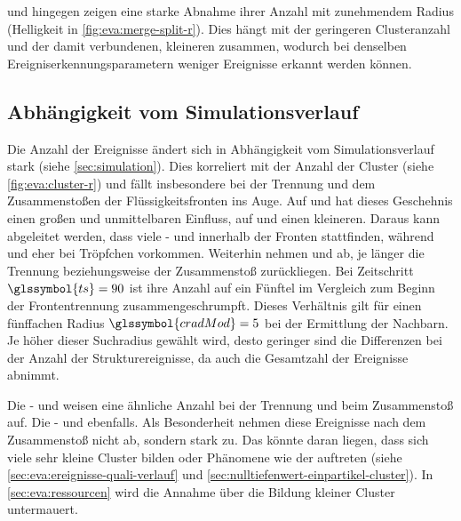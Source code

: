 und  hingegen zeigen eine starke Abnahme ihrer Anzahl mit zunehmendem Radius (Helligkeit in \autoref{fig:eva:merge-split-r}). Dies hängt mit der geringeren Clusteranzahl und der damit verbundenen, kleineren  zusammen, wodurch bei denselben Ereigniserkennungsparametern weniger Ereignisse erkannt werden können.

\subsection*{Abhängigkeit vom Simulationsverlauf}\label{sec:eva:ereignis-verlauf}
Die Anzahl der Ereignisse ändert sich in Abhängigkeit vom Simulationsverlauf stark (siehe \autoref{sec:simulation}). Dies korreliert mit der Anzahl der Cluster (siehe \autoref{fig:eva:cluster-r}) und fällt insbesondere bei der Trennung und dem Zusammenstoßen der Flüssigkeitsfronten ins Auge. Auf  und  hat dieses Geschehnis einen großen und unmittelbaren Einfluss, auf  und  einen kleineren.
Daraus kann abgeleitet werden, dass viele - und  innerhalb der Fronten stattfinden, während  und  eher bei Tröpfchen vorkommen. Weiterhin nehmen  und  ab, je länger die Trennung beziehungsweise der Zusammenstoß zurückliegen. Bei Zeitschritt $\glssymbol{ts} = 90$ ist ihre Anzahl auf ein Fünftel im Vergleich zum Beginn der Frontentrennung zusammengeschrumpft. Dieses Verhältnis gilt für einen fünffachen Radius $\glssymbol{cradMod} = 5$ bei der Ermittlung der Nachbarn. Je höher dieser Suchradius gewählt wird, desto geringer sind die Differenzen bei der Anzahl der Strukturereignisse, da auch die Gesamtzahl der Ereignisse abnimmt.

Die - und  weisen eine ähnliche Anzahl bei der Trennung und beim Zusammenstoß auf. Die - und  ebenfalls. Als Besonderheit nehmen diese Ereignisse nach dem Zusammenstoß nicht ab, sondern stark zu. Das könnte daran liegen, dass sich viele sehr kleine Cluster bilden oder Phänomene wie der  auftreten (siehe \autoref{sec:eva:ereignisse-quali-verlauf} und \autoref{sec:nulltiefenwert-einpartikel-cluster}). In \autoref{sec:eva:ressourcen} wird die Annahme über die Bildung kleiner Cluster untermauert.

